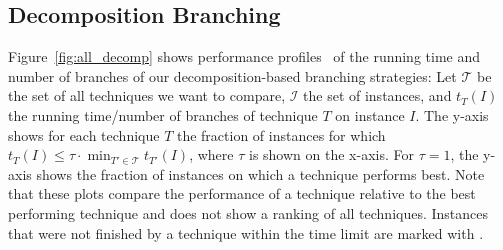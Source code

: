\documentclass[a4paper,UKenglish,cleveref, autoref, thm-restate]{lipics-v2021}
\begin{document}
\subsection{Decomposition Branching}\label{sec:experiments_decomp}

Figure~\ref{fig:all_decomp} shows performance profiles~\cite{dolan2002benchmarking} of the running time and
number of branches of
our decomposition-based branching strategies:
Let $\mathcal{T}$ be the set of all techniques we want to compare, $\mathcal{I}$
the set of instances, and $t_{T}({I})$ the running time/number of branches of
technique $T$ on instance $I$. The y-axis shows for each technique $T$ the
fraction of instances for which $t_T(I) \leq \tau \cdot \min_{T' \in
  \mathcal{T}}t_{T'}(I)$, where $\tau$ is shown on the x-axis. For $\tau = 1$,
the y-axis shows the fraction of instances on which a technique performs best.
Note that these plots compare the performance of a technique relative to the
best performing technique and does not show a ranking of all techniques.
Instances that were not finished by a technique within the time limit are marked
with \ClockLogo{}.
\end{document}
